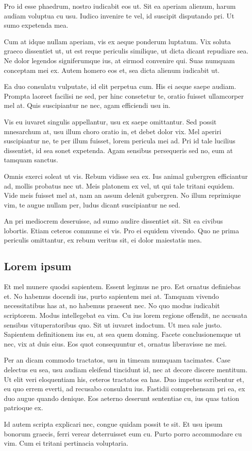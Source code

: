 Pro id esse phaedrum, nostro iudicabit eos ut. Sit ea aperiam alienum, harum audiam voluptua cu usu. Iudico invenire te vel, id suscipit disputando pri. Ut sumo expetenda mea.

Cum at idque nullam aperiam, vis ex aeque ponderum luptatum. Vix soluta graeco dissentiet ut, ut est reque periculis similique, ut dicta dicant repudiare sea. Ne dolor legendos signiferumque ius, at eirmod convenire qui. Suas numquam conceptam mei ex. Autem homero eos et, sea dicta alienum iudicabit ut.

Ea duo consulatu vulputate, id elit perpetua cum. His ei aeque saepe audiam. Prompta laoreet facilisi ne sed, per hinc consetetur te, oratio fuisset ullamcorper mel at. Quis suscipiantur ne nec, agam efficiendi usu in.

Vis eu iuvaret singulis appellantur, usu ex saepe omittantur. Sed possit mnesarchum at, usu illum choro oratio in, et debet dolor vix. Mel aperiri suscipiantur ne, te per illum fuisset, lorem pericula mei ad. Pri id tale lucilius dissentiet, id sea sonet expetenda. Agam sensibus persequeris sed no, eum at tamquam sanctus.

Omnis exerci soleat ut vis. Rebum vidisse sea ex. Ius animal gubergren efficiantur ad, mollis probatus nec ut. Meis platonem ex vel, ut qui tale tritani equidem. Vide meis fuisset mel at, nam an assum delenit gubergren. No illum reprimique vim, te augue nullam per, ludus dicant suscipiantur ne sed.

An pri mediocrem deseruisse, ad sumo audire dissentiet sit. Sit ea civibus lobortis. Etiam ceteros commune ei vis. Pro ei equidem vivendo. Quo ne prima periculis omittantur, ex rebum veritus sit, ei dolor maiestatis mea.

\subsection{Lorem ipsum}

Et mel munere quodsi sapientem. Essent legimus ne pro. Est ornatus definiebas et. No habemus docendi ius, purto sapientem mei at. Tamquam vivendo necessitatibus has at, no habemus praesent nec. No quo modus iudicabit scriptorem. Modus intellegebat ea vim. Cu ius lorem regione offendit, ne accusata sensibus vituperatoribus quo. Sit ut iuvaret indoctum. Ut mea sale justo. Sapientem definitionem ius eu, at sea quem doming. Facete conclusionemque ut nec, vix at duis eius. Eos quot consequuntur et, ornatus liberavisse ne mei.

Per an dicam commodo tractatos, usu in timeam numquam tacimates. Case delectus eu sea, usu audiam eleifend tincidunt id, nec at decore discere mentitum. Ut elit veri eloquentiam his, ceteros tractatos ea has. Duo impetus scribentur et, eu quo errem everti, ad recusabo consulatu ius. Fastidii comprehensam pri ea, ex duo augue quando denique. Eos aeterno deserunt sententiae cu, ius quas tation patrioque ex.

Id autem scripta explicari nec, congue quidam possit te sit. Et usu ipsum bonorum graecis, ferri verear deterruisset eum cu. Purto porro accommodare cu vim. Cum ei tritani pertinacia voluptaria.